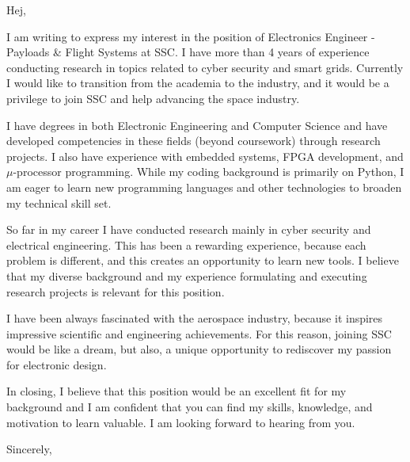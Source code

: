 \documentclass[letter,10pt]{letter}
\begin{document}
\begin{letter}{
}
 
\opening{Hej,}

I am writing to express my interest in the position of Electronics Engineer - Payloads \& Flight Systems at SSC. 
I have more than 4 years of experience conducting research in topics related to cyber security and smart grids. Currently I would like to transition from the academia to the industry, and it would be a privilege to join SSC and help advancing the space industry. 

I have degrees in both Electronic Engineering and Computer Science and have developed competencies in these fields (beyond coursework) through research projects. I also have experience with embedded systems, FPGA development, and $\mu$-processor programming. 
While my coding background is primarily on Python, I am eager to learn new programming languages and other technologies to broaden my technical skill set. 

So far in my career I have conducted research mainly in cyber security and electrical engineering.
This has been a rewarding experience, because each problem is different, and this creates an opportunity to learn new tools. 
I believe that my diverse background and my experience formulating and executing research projects is relevant for this position.



I have been always fascinated with the aerospace industry, because it inspires impressive scientific and engineering achievements. For this reason, joining SSC would be like a dream, but also, 
a unique opportunity to rediscover my passion for electronic design.


In closing, I believe that this position would be an excellent fit for my background and I am confident that you can find my skills, knowledge, and motivation to learn valuable. I am looking forward to hearing from you.




\closing{Sincerely,}



\end{letter}
\end{document}
